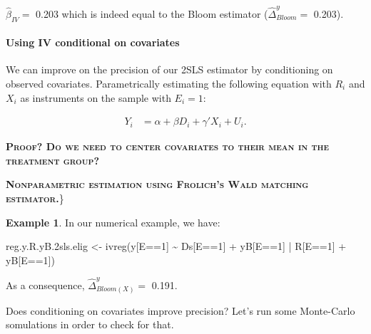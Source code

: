 \documentclass[
]{book}
\newenvironment{Shaded}{\begin{snugshade}}{\end{snugshade}}
\newcommand{\DecValTok}[1]{\textcolor[rgb]{0.00,0.00,0.81}{#1}}
\newcommand{\FloatTok}[1]{\textcolor[rgb]{0.00,0.00,0.81}{#1}}
\newcommand{\FunctionTok}[1]{\textcolor[rgb]{0.00,0.00,0.00}{#1}}
\newcommand{\NormalTok}[1]{#1}
\newcommand{\OtherTok}[1]{\textcolor[rgb]{0.56,0.35,0.01}{#1}}
\newcommand{\SpecialCharTok}[1]{\textcolor[rgb]{0.00,0.00,0.00}{#1}}
\theoremstyle{definition}
\theoremstyle{definition}
\newtheorem{example}{Example}[chapter]
\theoremstyle{definition}
\theoremstyle{definition}
\theoremstyle{remark}
\begin{document}
\(\hat{\beta}_{IV}=\) 0.203 which is indeed equal to the Bloom estimator (\(\hat{\Delta}^y_{Bloom}=\) 0.203).

\hypertarget{using-iv-conditional-on-covariates}{%
\paragraph{Using IV conditional on covariates}\label{using-iv-conditional-on-covariates}}

We can improve on the precision of our 2SLS estimator by conditioning on observed covariates.
Parametrically estimating the following equation with \(R_i\) and \(X_i\) as instruments on the sample with \(E_i=1\):

\begin{align*}
    Y_i &  = \alpha +  \beta D_i + \gamma' X_i + U_i.
\end{align*}

\textbf{\textsc{Proof? Do we need to center covariates to their mean in the treatment group?}}

\textbf{\textsc{Nonparametric estimation using Frolich's Wald matching estimator.}}\}

\begin{example}
\protect\hypertarget{exm:unnamed-chunk-100}{}{\label{exm:unnamed-chunk-100} }In our numerical example, we have:
\end{example}

\begin{Shaded}
\begin{Highlighting}[]
\NormalTok{reg.y.R.yB}\FloatTok{.2}\NormalTok{sls.elig }\OtherTok{\textless{}{-}} \FunctionTok{ivreg}\NormalTok{(y[E}\SpecialCharTok{==}\DecValTok{1}\NormalTok{] }\SpecialCharTok{\textasciitilde{}}\NormalTok{ Ds[E}\SpecialCharTok{==}\DecValTok{1}\NormalTok{] }\SpecialCharTok{+}\NormalTok{ yB[E}\SpecialCharTok{==}\DecValTok{1}\NormalTok{] }\SpecialCharTok{|}\NormalTok{ R[E}\SpecialCharTok{==}\DecValTok{1}\NormalTok{] }\SpecialCharTok{+}\NormalTok{ yB[E}\SpecialCharTok{==}\DecValTok{1}\NormalTok{])}
\end{Highlighting}
\end{Shaded}

As a consequence, \(\hat{\Delta}^y_{Bloom(X)}=\) 0.191.

Does conditioning on covariates improve precision?
Let's run some Monte-Carlo somulations in order to check for that.
\end{document}
